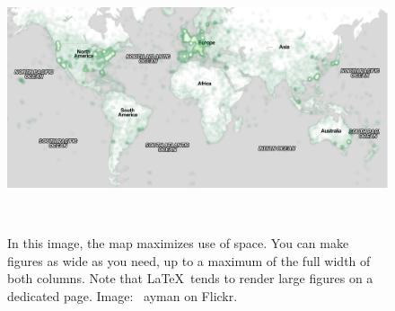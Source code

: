\documentclass{sigchi}
\begin{document}


\begin{figure}
  \centering
  \includegraphics[width=1.75\columnwidth]{figures/map}
  \caption{In this image, the map maximizes use of space. You can make
    figures as wide as you need, up to a maximum of the full width of
    both columns. Note that \LaTeX\ tends to render large figures on a
    dedicated page. Image: \ccbynd~ayman on
    Flickr.}~\label{fig:figure2}
\end{figure}
\end{document}
